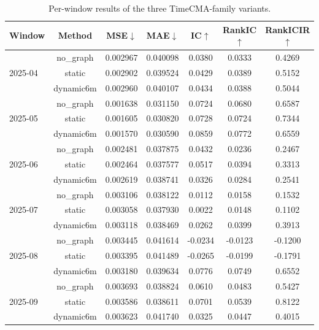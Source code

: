 \begin{table}[t]
\centering
\small
\setlength{\tabcolsep}{6pt}
\caption{Per-window results of the three TimeCMA-family variants.}
\label{tab:per_window_timecma}
\begin{tabular}{lcccccc}
\toprule
Window & Method & MSE$\downarrow$ & MAE$\downarrow$ & IC$\uparrow$ & RankIC$\uparrow$ & RankICIR$\uparrow$ \\
\midrule
\multirow{3}{*}{2025-04}
& no\_graph & 0.002967 & 0.040098 & 0.0380 & 0.0333 & 0.4269 \\
& static & 0.002902 & 0.039524 & 0.0429 & 0.0389 & 0.5152 \\
& dynamic6m & 0.002960 & 0.040107 & 0.0434 & 0.0388 & 0.5044 \\
\midrule
\multirow{3}{*}{2025-05}
& no\_graph & 0.001638 & 0.031150 & 0.0724 & 0.0680 & 0.6587 \\
& static & 0.001605 & 0.030820 & 0.0728 & 0.0724 & 0.7344 \\
& dynamic6m & 0.001570 & 0.030590 & 0.0859 & 0.0772 & 0.6559 \\
\midrule
\multirow{3}{*}{2025-06}
& no\_graph & 0.002481 & 0.037875 & 0.0432 & 0.0236 & 0.2467 \\
& static & 0.002464 & 0.037577 & 0.0517 & 0.0394 & 0.3313 \\
& dynamic6m & 0.002619 & 0.038741 & 0.0326 & 0.0284 & 0.2541 \\
\midrule
\multirow{3}{*}{2025-07}
& no\_graph & 0.003106 & 0.038122 & 0.0112 & 0.0158 & 0.1532 \\
& static & 0.003058 & 0.037930 & 0.0022 & 0.0148 & 0.1102 \\
& dynamic6m & 0.003118 & 0.038469 & 0.0262 & 0.0399 & 0.3913 \\
\midrule
\multirow{3}{*}{2025-08}
& no\_graph & 0.003445 & 0.041614 & -0.0234 & -0.0123 & -0.1200 \\
& static & 0.003395 & 0.041489 & -0.0265 & -0.0199 & -0.1791 \\
& dynamic6m & 0.003180 & 0.039634 & 0.0776 & 0.0749 & 0.6552 \\
\midrule
\multirow{3}{*}{2025-09}
& no\_graph & 0.003693 & 0.038824 & 0.0610 & 0.0483 & 0.5427 \\
& static & 0.003586 & 0.038611 & 0.0701 & 0.0539 & 0.8122 \\
& dynamic6m & 0.003623 & 0.041740 & 0.0325 & 0.0447 & 0.4015 \\
\bottomrule
\end{tabular}
\end{table}
